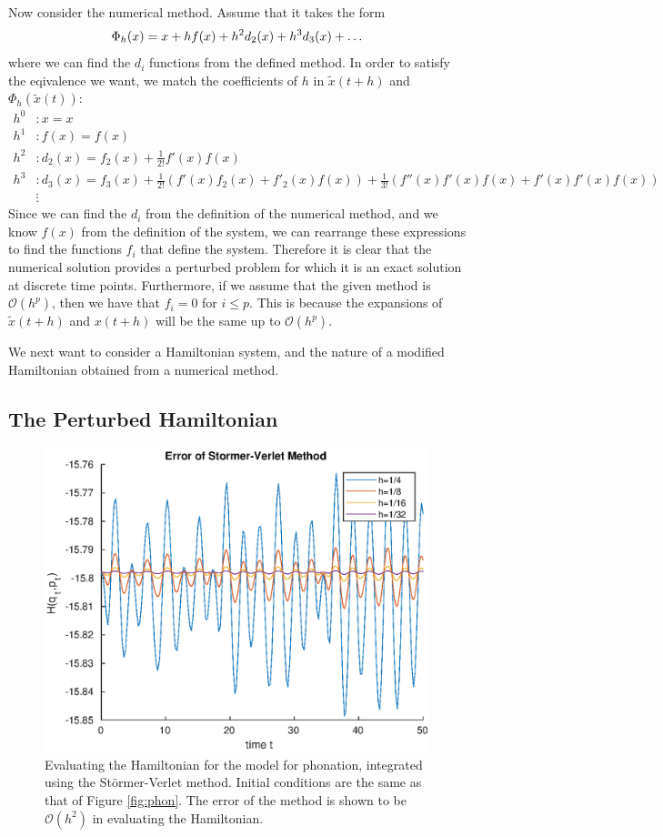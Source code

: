 Now consider the numerical method. Assume that it takes the form
\begin{equation*}
	\Phi_h(x) = x + h f(x) + h^2 d_2(x) + h^3 d_3(x) + \mathellipsis
\end{equation*}
where we can find the $d_i$ functions from the defined method. In order to satisfy the eqivalence we want, we match the coefficients of $h$ in $\tilde{x}(t+h)$ and $\Phi_h(\tilde{x}(t))$:
\begin{align*}
	h^0 &: x=x \\
	h^1 &: f(x) = f(x) \\
	h^2 &: d_2(x) = f_2(x) + \frac{1}{2!}f'(x)f(x) \\
	h^3 &: d_3(x) = f_3(x) + \frac{1}{2!}(f'(x)f_2(x) + f'_2(x)f(x)) + \frac{1}{3!}(f''(x)f'(x)f(x) + f'(x)f'(x)f(x)) \\
	& \vdots
\end{align*}
Since we can find the $d_i$ from the definition of the numerical method, and we know $f(x)$ from the definition of the system,
we can rearrange these expressions to find the functions $f_i$ that define the system.
Therefore it is clear that the numerical solution provides a perturbed problem for which it is an exact solution at discrete time points.
Furthermore, if we assume that the given method is $\mathcal{O}(h^p)$,
then we have that $f_i = 0$ for $i \leq p$.
This is because the expansions of $\tilde{x}(t+h)$ and $x(t+h)$ will be the same up to $\mathcal{O}(h^p)$.

We next want to consider a Hamiltonian system, and the nature of a modified Hamiltonian obtained from a numerical method.

\subsection{The Perturbed Hamiltonian}

\begin{figure}
	\centering
	\includegraphics[width = 0.5\linewidth]{figures/phonationerr.eps}
	\caption{
		Evaluating the Hamiltonian for the model for phonation, integrated using the St\"ormer-Verlet method.
		Initial conditions are the same as that of Figure \ref{fig:phon}.
		The error of the method is shown to be $\mathcal{O}(h^2)$ in evaluating the Hamiltonian.
	}
	\label{fig:phonhamil}
\end{figure}

